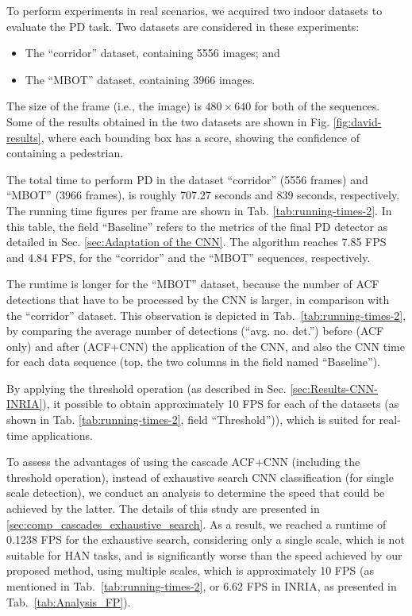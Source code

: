 \documentclass[5p,time]{elsarticle}
\begin{document}
To perform experiments in real scenarios, we acquired two indoor datasets to evaluate the PD task.
Two datasets are considered in these experiments:
\begin{itemize}
	\item{The ``corridor'' dataset, containing 5556 images; and} 
	\item{The ``MBOT'' dataset, containing 3966 images.} 
\end{itemize}
The size of the frame (i.e., the image) is $480\times 640$ for both of the sequences. Some of the results obtained in the two datasets are shown in Fig. \ref{fig:david-results}, where each bounding box has a score, showing the confidence of containing a pedestrian.

The total time to perform PD in the dataset ``corridor'' (5556 frames) and ``MBOT'' (3966 frames), is  roughly  707.27 seconds and 839 seconds, respectively. The running time figures per frame are shown in Tab. \ref{tab:running-times-2}. In this table, the field ``Baseline'' refers to the metrics of the final PD detector as detailed in Sec. \ref{sec:Adaptation of the CNN}. The algorithm reaches 7.85 FPS and 4.84 FPS, for the ``corridor'' and the ``MBOT'' sequences, respectively.

%

The runtime is longer for the ``MBOT'' dataset, because the number of ACF detections that have to be processed by the CNN is larger, in comparison with the ``corridor'' dataset. This observation is depicted in Tab.~\ref{tab:running-times-2}, by comparing the average number of detections (``avg. no. det.'') before (ACF only) and after (ACF+CNN) the application of the CNN, and also the CNN time for each data sequence (top, the two columns in the field named ``Baseline'').

By applying the threshold operation (as described in Sec. \ref{sec:Results-CNN-INRIA}), it possible to obtain approximately 10 FPS for each of the datasets (as shown in Tab. \ref{tab:running-times-2}, field   ``Threshold'')), which is suited for real-time applications.

To assess the advantages of using the cascade ACF+CNN (including the threshold operation), instead of exhaustive search CNN classification (for single scale detection), we conduct an analysis to determine the speed that could be achieved by the latter. The details of this study are presented in \ref{sec:comp_cascades_exhaustive_search}. As a result, we reached a runtime of 0.1238 FPS for the exhaustive search, considering only a single scale, which is not suitable for HAN tasks, and is significantly worse than the speed achieved by our proposed method, using multiple scales, which is approximately 10 FPS (as mentioned in Tab.~\ref{tab:running-times-2}, or 6.62 FPS in INRIA, as presented in Tab.~\ref{tab:Analysis_FP}).
\end{document}

